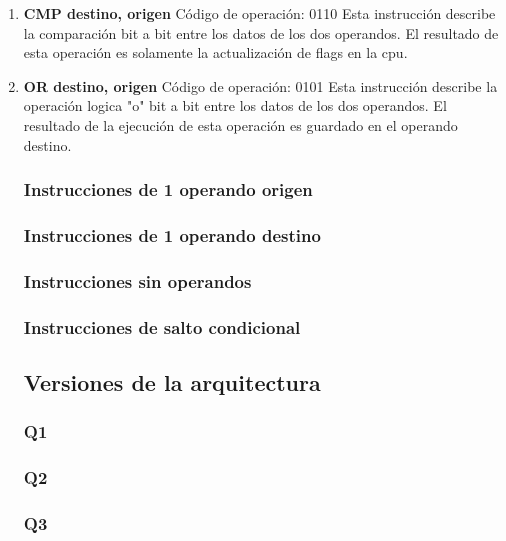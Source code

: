 \begin{enumerate}
\item \textbf{CMP destino, origen}
Código de operación: 0110
Esta instrucción describe la comparación bit a bit entre los datos de los dos operandos. El resultado de esta operación es solamente la actualización de flags en la cpu.

\item \textbf{OR destino, origen}
Código de operación: 0101
Esta instrucción describe la operación logica "o" bit a bit entre los datos de los dos operandos. El resultado de la ejecución de esta operación es guardado en el operando destino.


\subsubsection{Instrucciones de 1 operando origen}
\subsubsection{Instrucciones de 1 operando destino}
\subsubsection{Instrucciones sin operandos}
\subsubsection{Instrucciones de salto condicional}


\subsection{Versiones de la arquitectura}

\subsubsection{Q1}
\subsubsection{Q2}
\subsubsection{Q3}

\end{enumerate}
